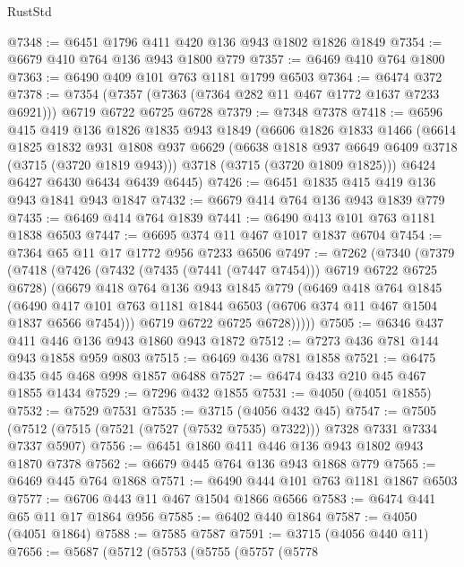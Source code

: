 \begin{lexlean}{RustStd}
\begin{coremodule}
@7348 := @6451 @1796 @411 @420 @136 @943 @1802 @1826 @1849
@7354 := @6679 @410 @764 @136 @943 @1800 @779
@7357 := @6469 @410 @764 @1800
@7363 := @6490 @409 @101 @763 @1181 @1799 @6503
@7364 := @6474 @372
@7378 := @7354 (@7357 (@7363 (@7364 @282 @11 @467 @1772 @1637 @7233 @6921))) @6719 @6722 @6725 @6728
@7379 := @7348 @7378
@7418 := @6596
    @415
    @419
    @136
    @1826
    @1835
    @943
    @1849
    (@6606
      @1826
      @1833
      @1466
      (@6614
        @1825
        @1832
        @931
        @1808
        @937
        @6629
        (@6638 @1818 @937 @6649 @6409 @3718 (@3715 (@3720 @1819 @943)))
        @3718
        (@3715 (@3720 @1809 @1825)))
      @6424
      @6427
      @6430
      @6434
      @6439
      @6445)
@7426 := @6451 @1835 @415 @419 @136 @943 @1841 @943 @1847
@7432 := @6679 @414 @764 @136 @943 @1839 @779
@7435 := @6469 @414 @764 @1839
@7441 := @6490 @413 @101 @763 @1181 @1838 @6503
@7447 := @6695 @374 @11 @467 @1017 @1837 @6704
@7454 := @7364 @65 @11 @17 @1772 @956 @7233 @6506
@7497 := @7262
    (@7340
      (@7379
        (@7418
          (@7426
            (@7432 (@7435 (@7441 (@7447 @7454))) @6719 @6722 @6725 @6728)
            (@6679
              @418
              @764
              @136
              @943
              @1845
              @779
              (@6469
                @418
                @764
                @1845
                (@6490
                  @417
                  @101
                  @763
                  @1181
                  @1844
                  @6503
                  (@6706 @374 @11 @467 @1504 @1837 @6566 @7454)))
              @6719
              @6722
              @6725
              @6728)))))
@7505 := @6346 @437 @411 @446 @136 @943 @1860 @943 @1872
@7512 := @7273 @436 @781 @144 @943 @1858 @959 @803
@7515 := @6469 @436 @781 @1858
@7521 := @6475 @435 @45 @468 @998 @1857 @6488
@7527 := @6474 @433 @210 @45 @467 @1855 @1434
@7529 := @7296 @432 @1855
@7531 := @4050 (@4051 @1855)
@7532 := @7529 @7531
@7535 := @3715 (@4056 @432 @45)
@7547 := @7505 (@7512 (@7515 (@7521 (@7527 (@7532 @7535) @7322))) @7328 @7331 @7334 @7337 @5907)
@7556 := @6451 @1860 @411 @446 @136 @943 @1802 @943 @1870 @7378
@7562 := @6679 @445 @764 @136 @943 @1868 @779
@7565 := @6469 @445 @764 @1868
@7571 := @6490 @444 @101 @763 @1181 @1867 @6503
@7577 := @6706 @443 @11 @467 @1504 @1866 @6566
@7583 := @6474 @441 @65 @11 @17 @1864 @956
@7585 := @6402 @440 @1864
@7587 := @4050 (@4051 @1864)
@7588 := @7585 @7587
@7591 := @3715 (@4056 @440 @11)
@7656 := @5687
    (@5712
      (@5753
        (@5755
          (@5757
            (@5778

\end{coremodule}
\end{lexlean}

